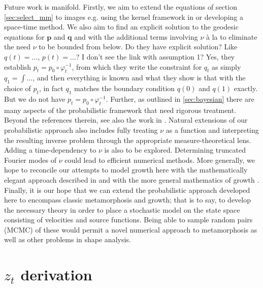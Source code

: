 \documentclass[runningheads]{llncs}
\begin{document}
Future work is manifold. Firstly, we aim to extend the equations of section
\ref{sec:select_mm} to images e.g. using the kernel framework in
\cite{richardson2016metamorphosis} or developing a space-time method. We also
aim to find an explicit solution to the geodesic equations for $\mathbf p$ and
$\mathbf q$ and with the additional terms involving $\nu$ à la
\cite{trouve2005local} to eliminate the need $\nu$ to be bounded from below.
{\color{red} Do they have explicit solution? Like $q(t) = \dots$, $p(t)= \dots$? 
I don't see the link with assumption 1?}{\color{blue} Yes, they establish $p_t =
p_0 \circ \varphi^{-1}_t$, from which they write the constraint for $q_t$ as
simply $q_1 = \int \dots$, and then everything is known and what they show is
that with the choice of $p_t$, in fact $q_1$ matches the boundary condition
$q(0)$ and $q(1)$ exactly. But we do not have $p_t = p_0 \circ \varphi^{-1}_t$.}
Further, as outlined in \ref{sec:bayesian} there
are many aspects of the probabilistic framework that need rigorous treatment.
Beyond the references therein, see also the work in \cite{dashti2013map}.
Natural extensions of our probabilistic approach also includes fully treating
$\nu$ as a function and interpreting the resulting inverse problem through the
appropriate measure-theoretical lens. Adding a time-dependency to $\nu$ is also
to be explored. Determining truncated Fourier modes of $\nu$ could lead to
efficient numerical methods. More generally, we hope to reconcile our attempts
to model growth here with the mathematically elegant approach described
in \cite{kaltenmark2016geometrical} and with the more general mathematics of
growth \cite{goriely2017mathematics}.\\

Finally, it is our hope that we can extend the probabilistic approach developed
here to encompass classic metamorphosis and growth; that is to say, to develop
the necessary theory in order to place a stochastic model on the state space
consisting of velocities and source functions. Being able to sample random pairs
(MCMC) of these would permit a novel numerical approach to metamorphosis as well
as other problems in shape analysis.

\appendix
\iffalse
\section{$z_t$ derivation}\label{app:z_derivation}
\end{document}
